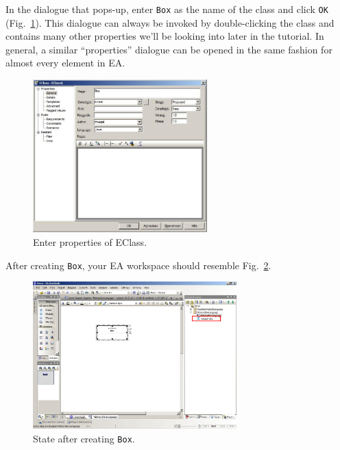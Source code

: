 \clearpage

In the dialogue that pops-up, enter \texttt{Box} as the name of the class and
click \texttt{OK} (Fig.~\ref{fig:eclass_properties}).  This dialogue can
always be invoked by double-clicking the class and contains many other
properties we'll be looking into later in the tutorial.  In general, a similar
``properties'' dialogue can be opened in the same fashion for almost every
element in EA.

\begin{figure}[htbp]
	\centering
  \includegraphics[width=0.6\textwidth]{pics/memBox08.png}
	\caption{Enter properties of EClass.}
	\label{fig:eclass_properties}
\end{figure}

After creating \texttt{Box}, your EA workspace should resemble
Fig.~\ref{fig:eclass_completed}. 

\begin{figure}[htbp]
	\centering
  \includegraphics[width=0.7\textwidth]{pics/memBox09.png}
	\caption{State after creating \texttt{Box}.}
	\label{fig:eclass_completed}
\end{figure}

\clearpage

